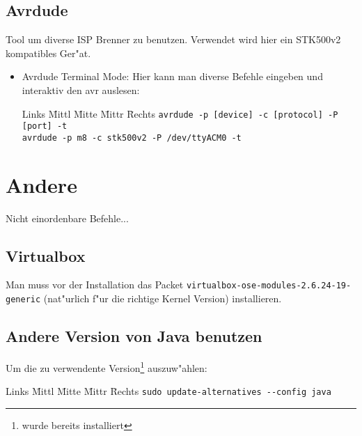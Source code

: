 \documentclass[12pt]{article}
\newenvironment{code}{\begin{tabbing}Links \= Mittl \= Mitte \= Mittr \= Rechts \kill}{\end{tabbing}}
\begin{document}
\subsection{Avrdude}
Tool um diverse ISP Brenner zu benutzen. Verwendet wird hier ein STK500v2 kompatibles Ger"at.
\begin{itemize}
	\item Avrdude Terminal Mode: Hier kann man diverse Befehle eingeben und interaktiv den avr auslesen:
	\begin{code}
		\> \verb#avrdude -p [device] -c [protocol] -P [port] -t# \\
		\> \verb#avrdude -p m8 -c stk500v2 -P /dev/ttyACM0 -t#
	\end{code}
\end{itemize}

\section{Andere}
Nicht einordenbare Befehle...
\subsection{Virtualbox}
Man muss vor der Installation das Packet \verb#virtualbox-ose-modules-2.6.24-19-generic# (nat"urlich 
f"ur die richtige Kernel Version) installieren.
\subsection{Andere Version von Java benutzen}
Um die zu verwendente Version\footnote{wurde bereits installiert} auszuw"ahlen:
\begin{code}
	\> \verb#sudo update-alternatives --config java#
\end{code}
\end{document}
